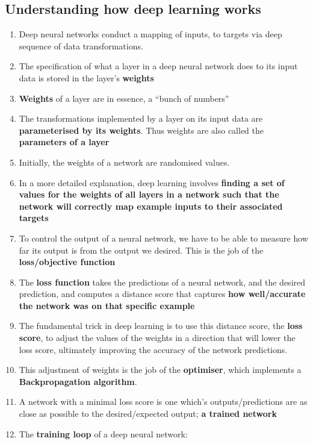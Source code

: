 \documentclass[12pt, a4paper]{article}
\begin{document}
\subsection{Understanding how deep learning works}
\begin{enumerate}
   \item Deep neural networks conduct a mapping of inputs, to targets via deep sequence
   of data transformations.
   \item The specification of what a layer in a deep neural network does to its input data
   is stored in the layer's \textbf{weights}
   \item \textbf{Weights} of a layer are in essence, a ``bunch of numbers''
   \item The transformations implemented by a layer on its input data are \textbf{parameterised by its weights}.
   Thus weights are also called the \textbf{parameters of a layer}
   \item Initially, the weights of a network are randomised values.
   \item In a more detailed explanation, deep learning involves
   \textbf{finding a  set of values for the weights of all layers in a network
   such that the network will correctly map example inputs to their associated targets}
   \item To control the output of a neural network, we have to be able to measure how far its output is 
   from the output we desired. This is the job of the \textbf{loss/objective function}
   \item The \textbf{loss function} takes the predictions of a neural network, and the 
   desired prediction, and computes a distance score that captures \textbf{how well/accurate the network was on that specific example}
   \item The fundamental trick in deep learning is to use this distance score, the \textbf{loss score},
   to adjust the values of the weights in a direction that will lower the loss score,
   ultimately improving the accuracy of the network predictions.
   \item This adjustment of weights is the job of the \textbf{optimiser}, which
   implements a \textbf{Backpropagation algorithm}.
   \item A network with a minimal loss score is one which's outputs/predictions are 
   as close as possible to the desired/expected output; \textbf{a trained network}

   \item The \textbf{training loop} of a deep neural network:
   

\end{enumerate}
\end{document}
